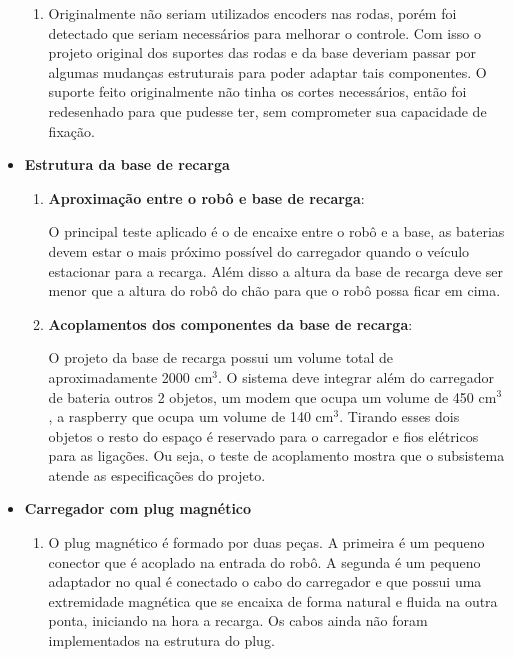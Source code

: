 \begin{itemize}
\begin{enumerate}
   			\item Originalmente não seriam utilizados encoders nas rodas, porém foi detectado que seriam necessários para melhorar o controle. Com isso o projeto original dos suportes das rodas e da base deveriam passar por algumas mudanças estruturais para poder adaptar tais componentes. O suporte feito originalmente não tinha os cortes necessários, então foi redesenhado para que pudesse ter, sem comprometer sua capacidade de fixação.

   		\end{enumerate}

   		\item \textbf{Estrutura da base de recarga}
   			\begin{enumerate}
   				\item \textbf{Aproximação entre o robô e base de recarga}:

   					O principal teste aplicado é o de encaixe entre o robô e a base, as baterias devem estar o mais próximo possível do carregador quando o veículo estacionar para a recarga. Além disso a altura da base de recarga deve ser menor que a altura do robô do chão para que o robô possa ficar em cima.


   				\item \textbf{Acoplamentos dos componentes da base de recarga}:

   					O projeto da base de recarga possui um volume total de aproximadamente 2000 cm$^3$. O sistema deve integrar além do carregador de bateria outros 2 objetos, um modem que ocupa um volume de 450 cm$^3$, a raspberry que ocupa um volume de 140 cm$^3$. Tirando esses dois objetos o resto do espaço é reservado para o carregador e fios elétricos para as ligações. Ou seja, o teste de acoplamento mostra que o subsistema atende as especificações do projeto.

   			\end{enumerate}


	 \item \textbf{Carregador com plug magnético}
		 \begin{enumerate}
		 	\item O plug magnético é formado por duas peças. A primeira é um pequeno conector que é acoplado na entrada do robô. A segunda é um pequeno adaptador no qual é conectado o cabo do carregador e que possui uma extremidade magnética que se encaixa de forma natural e fluida na outra ponta, iniciando na hora a recarga. Os cabos ainda não foram implementados na estrutura do plug.


\end{enumerate}
\end{itemize}

